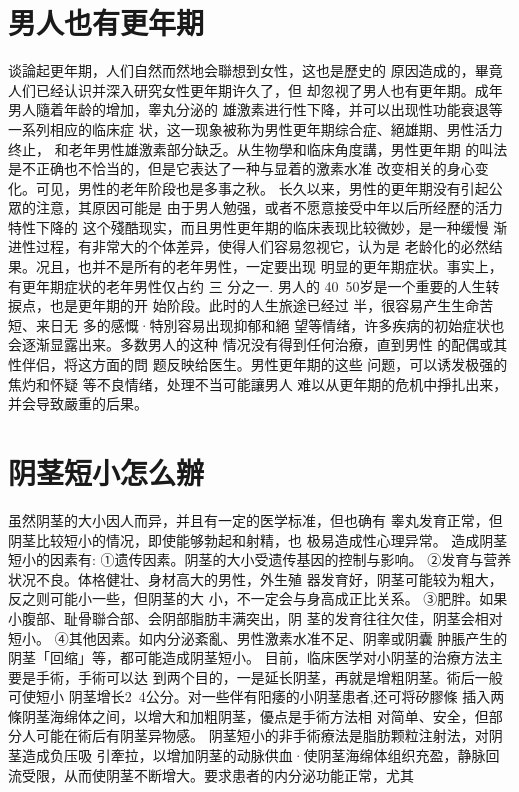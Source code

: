 \documentclass[12pt,UTF8]{ctexbook}
\begin{document}
\section{男人也有更年期}
谈論起更年期，人们自然而然地会聯想到女性，这也是歷史的
原因造成的，畢竟人们已经认识并深入研究女性更年期许久了，但
却忽视了男人也有更年期。成年男人隨着年龄的增加，睾丸分泌的
雄激素进行性下降，并可以出现性功能衰退等一系列相应的临床症
状，这一现象被称为男性更年期综合症、絕雄期、男性活力终止，
和老年男性雄激素部分缺乏。从生物學和临床角度講，男性更年期
的叫法是不正确也不恰当的，但是它表达了一种与显着的激素水准
改变相关的身心变化。可见，男性的老年阶段也是多事之秋。
长久以来，男性的更年期没有引起公眾的注意，其原因可能是
由于男人勉强，或者不愿意接受中年以后所经歷的活力特性下降的
这个殘酷现实，而且男性更年期的临床表现比较微妙，是一种缓慢
渐进性过程，有非常大的个体差异，使得人们容易忽视它，认为是
老龄化的必然结果。况且，也并不是所有的老年男性，一定要出现
明显的更年期症状。事实上，有更年期症状的老年男性仅占约 三
分之一.
男人的 40~50岁是一个重要的人生转捩点，也是更年期的开
始阶段。此时的人生旅途已经过
半，很容易产生生命苦短、来日无
多的感慨·特別容易出现抑郁和絕
望等情绪，许多疾病的初始症状也
会逐渐显露出来。多数男人的这种
情况没有得到任何治療，直到男性
的配偶或其性伴侣，将这方面的問
题反映给医生。男性更年期的这些
问题，可以诱发极强的焦灼和怀疑
等不良情绪，处理不当可能讓男人
难以从更年期的危机中掙扎出来，
并会导致嚴重的后果。

\section{阴茎短小怎么辦}
虽然阴茎的大小因人而异，并且有一定的医学标准，但也确有
睾丸发育正常，但阴茎比较短小的情况，即使能够勃起和射精，也
极易造成性心理异常。
造成阴茎短小的因素有:
①遗传因素。阴茎的大小受遗传基因的控制与影响。
②发育与营养状况不良。体格健壮、身材高大的男性，外生殖
器发育好，阴茎可能较为粗大，反之则可能小一些，但阴茎的大
小，不一定会与身高成正比关系。
③肥胖。如果小腹部、耻骨聯合部、会阴部脂肪丰满突出，阴
茎的发育往往欠佳，阴茎会相对短小。
④其他因素。如内分泌紊亂、男性激素水准不足、阴睾或阴囊
肿脹产生的阴茎「回缩」等，都可能造成阴茎短小。
目前，临床医学对小阴茎的治療方法主要是手術，手術可以达
到两个目的，一是延长阴茎，再就是增粗阴茎。術后一般可使短小
阴茎增长2~4公分。对一些伴有阳痿的小阴茎患者,还可将矽膠條
插入两條阴茎海绵体之间，以增大和加粗阴茎，優点是手術方法相
对简单、安全，但部分人可能在術后有阴茎异物感。
阴茎短小的非手術療法是脂肪颗粒注射法，对阴茎造成负压吸
引牽拉，以增加阴茎的动脉供血·使阴茎海绵体组织充盈，静脉回
流受限，从而使阴茎不断增大。要求患者的内分泌功能正常，尤其
\end{document}
